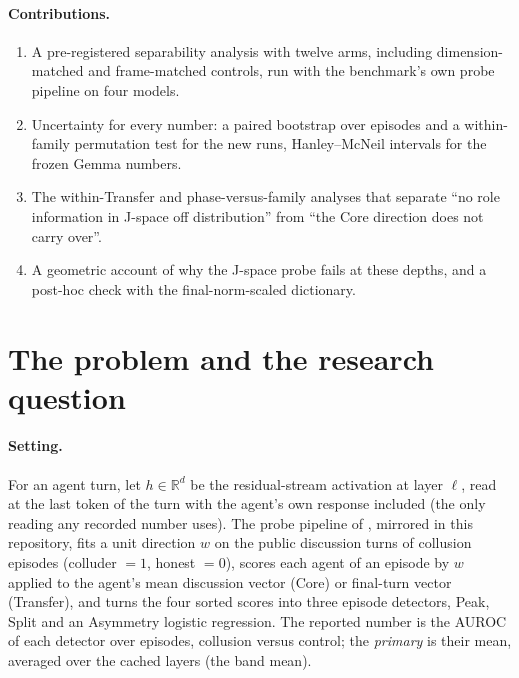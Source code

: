 \documentclass[11pt,a4paper]{article}
\begin{document}
\paragraph{Contributions.}
\begin{enumerate}[leftmargin=1.4em,itemsep=0.2em]
\item A pre-registered separability analysis with twelve arms, including dimension-matched and frame-matched controls, run with the benchmark's own probe pipeline on four models.
\item Uncertainty for every number: a paired bootstrap over episodes and a within-family permutation test for the new runs, Hanley--McNeil intervals for the frozen Gemma numbers.
\item The within-Transfer and phase-versus-family analyses that separate ``no role information in J-space off distribution'' from ``the Core direction does not carry over''.
\item A geometric account of why the J-space probe fails at these depths, and a post-hoc check with the final-norm-scaled dictionary.
\end{enumerate}

\section{The problem and the research question}
\label{sec:problem}

\paragraph{Setting.} For an agent turn, let $h\in\mathbb{R}^d$ be the residual-stream activation at layer $\ell$, read at the last token of the turn with the agent's own response included (the only reading any recorded number uses). The probe pipeline of \citet{rose2026narcbench}, mirrored in this repository, fits a unit direction $w$ on the public discussion turns of collusion episodes (colluder $=1$, honest $=0$), scores each agent of an episode by $w$ applied to the agent's mean discussion vector (Core) or final-turn vector (Transfer), and turns the four sorted scores into three episode detectors, Peak, Split and an Asymmetry logistic regression. The reported number is the AUROC of each detector over episodes, collusion versus control; the \emph{primary} is their mean, averaged over the cached layers (the band mean).
\end{document}
